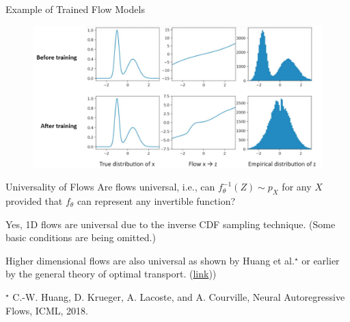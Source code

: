 \begin{frame}[allowframebreaks]
\begin{myexampleblock}{10.10}{Example of Trained Flow Models}
    \begin{figure}[H]
        \centering
        \includegraphics[width=1.0\textwidth]{.././assets/10.10.png}
    \end{figure}
\end{myexampleblock}

\end{frame}


\begin{frame}[allowframebreaks]

\par\noindent\textcolor{gray}{\hdashrule{\textwidth}{0.4pt}{1pt 2pt}}

\end{frame}

\begin{frame}[allowframebreaks]

\begin{myconceptblock}{10.11}{Universality of Flows}
    Are flows universal, i.e., can $f_{\theta}^{-1}(Z) \sim p_{X}$ for any $X$ provided that $f_{\theta}$ can represent any invertible function?

    Yes, 1D flows are universal due to the inverse CDF sampling technique. (Some basic conditions are being omitted.)

    Higher dimensional flows are also universal as shown by Huang et al.$^{\star}$ or earlier by the general theory of optimal transport. (\href{https://en.wikipedia.org/wiki/Transportation_theory_(mathematics}{link}))

    $^{\star}$ C.-W. Huang, D. Krueger, A. Lacoste, and A. Courville, Neural Autoregressive Flows, ICML, 2018.
\end{myconceptblock}

\end{frame}

